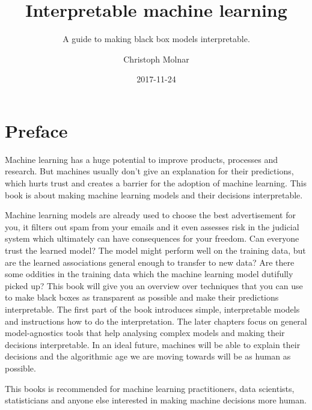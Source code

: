 \documentclass[12pt,]{krantz}
\title{Interpretable machine learning}
\subtitle{A guide to making black box models interpretable.}
\author{Christoph Molnar}
\date{2017-11-24}
\theoremstyle{definition}
\theoremstyle{definition}
\theoremstyle{definition}
\theoremstyle{remark}
\begin{document}
\maketitle



\setlength{\abovedisplayskip}{-5pt}
\setlength{\abovedisplayshortskip}{-5pt}

{
\hypersetup{linkcolor=black}
\setcounter{tocdepth}{1}
\tableofcontents
}
\chapter*{Preface}\label{preface}

Machine learning has a huge potential to improve products, processes and
research. But machines usually don't give an explanation for their
predictions, which hurts trust and creates a barrier for the adoption of
machine learning. This book is about making machine learning models and
their decisions interpretable.

Machine learning models are already used to choose the best
advertisement for you, it filters out spam from your emails and it even
assesses risk in the judicial system which ultimately can have
consequences for your freedom. Can everyone trust the learned model? The
model might perform well on the training data, but are the learned
associations general enough to transfer to new data? Are there some
oddities in the training data which the machine learning model dutifully
picked up? This book will give you an overview over techniques that you
can use to make black boxes as transparent as possible and make their
predictions interpretable. The first part of the book introduces simple,
interpretable models and instructions how to do the interpretation. The
later chapters focus on general model-agnostics tools that help
analysing complex models and making their decisions interpretable. In an
ideal future, machines will be able to explain their decisions and the
algorithmic age we are moving towards will be as human as possible.

This books is recommended for machine learning practitioners, data
scientists, statisticians and anyone else interested in making machine
decisions more human.
\end{document}
